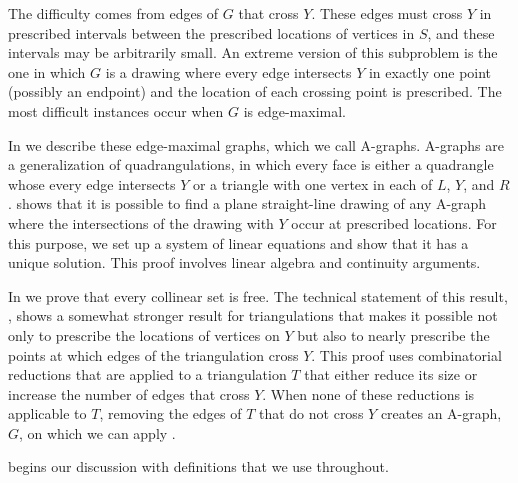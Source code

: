 The difficulty comes from edges of $G$ that cross $Y$.
These edges must cross $Y$ in prescribed
intervals between the prescribed locations of vertices in $S$, and
these intervals may be arbitrarily small.  An extreme version of this
subproblem is the one in which $G$ is a drawing where every
edge intersects $Y$ in exactly one point (possibly an endpoint) and
the location of each crossing point is prescribed.  The most difficult
instances occur when $G$ is edge-maximal.

In  we describe these edge-maximal graphs, which
we call A-graphs.  A-graphs are a generalization of quadrangulations, in
which every face is either a quadrangle whose every edge intersects $Y$ or a triangle with one vertex in
each of $L$, $Y$, and $R$.   %
shows that it
is possible to find a plane straight-line drawing of any A-graph where
the intersections of the drawing with $Y$ occur at prescribed locations.
For this purpose, we set up a system of linear equations and show that
it has a unique solution. This proof involves linear algebra and
 continuity arguments.

In  we prove that every collinear set is free.
The technical statement of this result, , shows a somewhat
stronger result for triangulations that makes it possible not only to
prescribe the locations of vertices on $Y$ but also to nearly prescribe the
points at which edges of the triangulation cross $Y$.  This proof uses combinatorial
reductions that are applied to a triangulation $T$ that either reduce its
size or increase the number of edges that cross $Y$.  When none of these
reductions is applicable to $T$, removing the edges of $T$ that do not
cross $Y$ creates an A-graph, $G$, on which we can apply .

 begins our discussion with definitions %
 that we use throughout.

